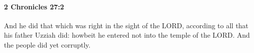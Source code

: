 
		\paragraph{2 Chronicles 27:2} %
			\label{2CHRONICLES-27-2}

			And he did that which was right in the sight of the LORD, according to all that his father Uzziah did: howbeit he entered not into the temple of the LORD. And the people did yet corruptly.


